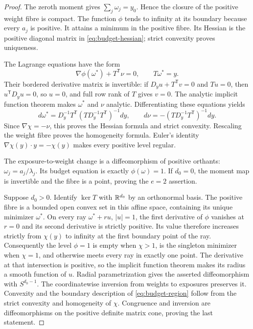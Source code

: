 \begin{proof}
The zeroth moment gives $\sum_j\omega_j=y_0$. Hence the closure of the positive weight fibre is compact. The function $\phi$ tends to infinity at its boundary because every $a_j$ is positive. It attains a minimum in the positive fibre. Its Hessian is the positive diagonal matrix in \eqref{eq:budget-hessian}; strict convexity proves uniqueness.

The Lagrange equations have the form
\[
 \nabla\phi(\omega^*)+T^{\mathsf T}\nu=0,
 \qquad T\omega^*=y.
\]
Their bordered derivative matrix is invertible: if $D_y u+T^{\mathsf T}v=0$ and $Tu=0$, then $u^{\mathsf T}D_yu=0$, so $u=0$, and full row rank of $T$ gives $v=0$. The analytic implicit function theorem makes $\omega^*$ and $\nu$ analytic. Differentiating these equations yields
\[
 d\omega^*=D_y^{-1}T^{\mathsf T}(TD_y^{-1}T^{\mathsf T})^{-1}dy,
 \qquad d\nu=-(TD_y^{-1}T^{\mathsf T})^{-1}dy.
\]
Since $\nabla\chi=-\nu$, this proves the Hessian formula and strict convexity. Rescaling the weight fibre proves the homogeneity formula. Euler's identity $\nabla\chi(y)\cdot y=-\chi(y)$ makes every positive level regular.

The exposure-to-weight change is a diffeomorphism of positive orthants:
$\omega_j=a_j/\lambda_j$. Its budget equation is exactly $\phi(\omega)=1$. If $d_0=0$, the moment map is invertible and the fibre is a point, proving the $e=2$ assertion.

Suppose $d_0>0$. Identify $\ker T$ with $\mathbb R^{d_0}$ by an orthonormal basis. The positive fibre is a bounded open convex set in this affine space, containing its unique minimizer $\omega^*$. On every ray $\omega^*+ru$, $|u|=1$, the first derivative of $\phi$ vanishes at $r=0$ and its second derivative is strictly positive. Its value therefore increases strictly from $\chi(y)$ to infinity at the first boundary point of the ray. Consequently the level $\phi=1$ is empty when $\chi>1$, is the singleton minimizer when $\chi=1$, and otherwise meets every ray in exactly one point. The derivative at that intersection is positive, so the implicit function theorem makes its radius a smooth function of $u$. Radial parametrization gives the asserted diffeomorphism with $S^{d_0-1}$. The coordinatewise inversion from weights to exposures preserves it. Convexity and the boundary description of \eqref{eq:budget-region} follow from the strict convexity and homogeneity of $\chi$. Congruence and inversion are diffeomorphisms on the positive definite matrix cone, proving the last statement.
\end{proof}

